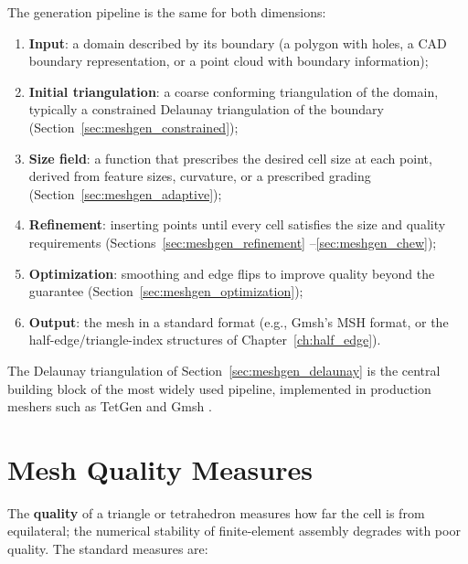 The generation pipeline is the same for both dimensions:
\begin{enumerate}
  \item \textbf{Input}: a domain described by its boundary (a polygon with
    holes, a CAD boundary representation, or a point cloud with boundary
    information);
  \item \textbf{Initial triangulation}: a coarse conforming triangulation of
    the domain, typically a constrained Delaunay triangulation of the
    boundary (Section~\ref{sec:meshgen_constrained});
  \item \textbf{Size field}: a function that prescribes the desired cell
    size at each point, derived from feature sizes, curvature, or a
    prescribed grading (Section~\ref{sec:meshgen_adaptive});
  \item \textbf{Refinement}: inserting points until every cell satisfies
    the size and quality requirements (Sections~\ref{sec:meshgen_refinement}
    --\ref{sec:meshgen_chew});
  \item \textbf{Optimization}: smoothing and edge flips to improve quality
    beyond the guarantee (Section~\ref{sec:meshgen_optimization});
  \item \textbf{Output}: the mesh in a standard format (e.g., Gmsh's MSH
    format, or the half-edge/triangle-index structures of
    Chapter~\ref{ch:half_edge}).
\end{enumerate}
The Delaunay triangulation of Section~\ref{sec:meshgen_delaunay} is the
central building block of the most widely used pipeline, implemented in
production meshers such as TetGen \cite{si2015} and Gmsh \cite{geuzaine2009}.


\section{Mesh Quality Measures}
\label{sec:meshgen_quality}

The \textbf{quality} of a triangle or tetrahedron measures how far the cell
is from equilateral; the numerical stability of finite-element assembly
degrades with poor quality. The standard measures are:

